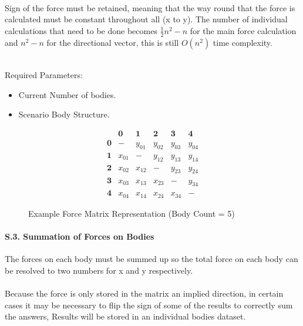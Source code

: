 \paragraph{}
Sign of the force must be retained, meaning that the way round that the force is calculated must be constant throughout all (x to y).
The number of individual calculations that need to be done becomes $\frac{1}{2}n^2-n$ for the main force calculation and $n^2-n$ for the directional vector, this is still $O(n^2)$ time complexity. \\\

Required Parameters:
\begin{itemize}
\item Current Number of bodies.
\item Scenario Body Structure. 
\end{itemize}

\begin{figure}[!ht]
  \centering
  $$\begin{array}{c|c|c|c|c|c}
  ~ & \textbf{0} & \textbf{1} & \textbf{2} & \textbf{3} & \textbf{4} \\ 
  \hline
  \textbf{0} & -      & y_{01} & y_{02} & y_{03} & y_{04} \\
  \hline
  \textbf{1} & x_{01} & -      & y_{12} & y_{13} & y_{14} \\
  \hline
  \textbf{2} & x_{02} & x_{12} & -      & y_{23} & y_{24} \\
  \hline
  \textbf{3} & x_{03} & x_{13} & x_{23} & -      & y_{34} \\
  \hline
  \textbf{4} & x_{04} & x_{14} & x_{24} & x_{34} & -
 \end{array}$$
  \caption{Example Force Matrix Representation (Body Count = 5)}
\end{figure}

\paragraph{S.3. Summation of Forces on Bodies}
The forces on each body must be summed up so the total force on each body can be resolved to two numbers for x and y respectively.

\paragraph{}
Because the force is only stored in the matrix an implied direction, in certain cases it may be necessary to flip the sign of some of the results to correctly sum the answers, Results will be stored in an individual bodies dataset.

